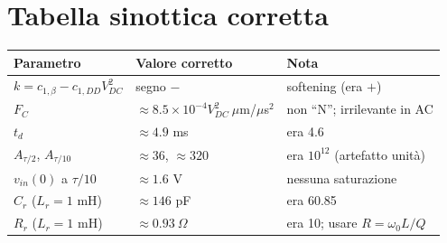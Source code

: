 \documentclass[11pt,a4paper]{article}
\begin{document}
\section{Tabella sinottica corretta}
\begin{table}[h!]
\centering
\begin{tabular}{@{}lll@{}}
\toprule
\textbf{Parametro} & \textbf{Valore corretto} & \textbf{Nota} \\ \midrule
$k=c_{1,\beta}-c_{1,DD}V_{DC}^2$ & segno $-$ & softening (era $+$) \\
$F_C$ & $\approx8.5\times10^{-4}V_{DC}^2\ \mu$m/$\mu$s$^2$ & non ``N''; irrilevante in AC \\
$t_d$ & $\approx4.9$ ms & era 4.6 \\
$A_{\tau/2}$, $A_{\tau/10}$ & $\approx36$, $\approx320$ & era $10^{12}$ (artefatto unit\`a) \\
$v_{in}(0)$ a $\tau/10$ & $\approx1.6$ V & nessuna saturazione \\
$C_r$ ($L_r=1$ mH) & $\approx146$ pF & era 60.85 \\
$R_r$ ($L_r=1$ mH) & $\approx0.93\ \Omega$ & era 10; usare $R=\omega_0L/Q$ \\ \bottomrule
\end{tabular}
\end{table}
\end{document}

